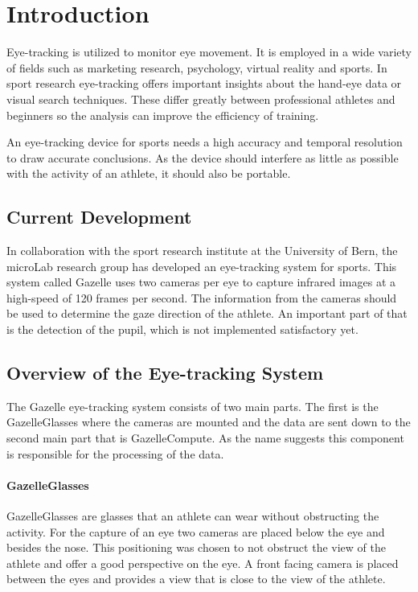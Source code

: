 \chapter{Introduction}

\label{chap:introduction}
Eye-tracking is utilized to monitor eye movement. It is employed in a wide variety of fields such as marketing research, psychology, virtual reality and sports. In sport research eye-tracking offers important insights about the hand-eye data or visual search techniques. These differ greatly between professional athletes and beginners so the analysis can improve the efficiency of training. 

An eye-tracking device for sports needs a high accuracy and temporal resolution to draw accurate conclusions. As the device should interfere as little as possible with the activity of an athlete, it should also be portable. 

\section{Current Development}
In collaboration with the sport research institute at the University of Bern, the microLab research group has developed an eye-tracking system for sports. This system called Gazelle uses two cameras per eye to capture infrared images at a high-speed of 120 frames per second. The information from the cameras should be used to determine the gaze direction of the athlete. An important part of that is the detection of the pupil, which is not implemented satisfactory yet.

\section{Overview of the Eye-tracking System}
The Gazelle eye-tracking system consists of two main parts. The first is the GazelleGlasses where the cameras are mounted and the data are sent down to the second main part that is GazelleCompute. As the name suggests this component is responsible for the processing of the data.

\subsubsection{GazelleGlasses}
GazelleGlasses are glasses that an athlete can wear without obstructing the activity.
For the capture of an eye two cameras are placed below the eye and besides the nose. This positioning was chosen to not obstruct the view of the athlete and offer a good perspective on the eye. A front facing camera is placed between the eyes and provides a view that is close to the view of the athlete.

